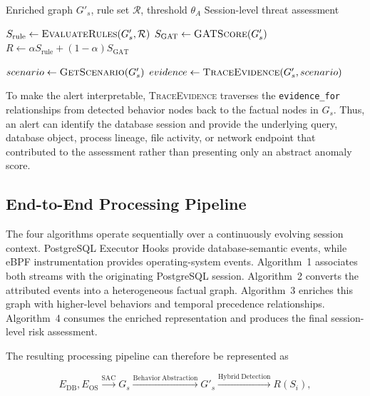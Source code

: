 \documentclass[conference]{IEEEtran}
\begin{document}
\begin{algorithm}[t]
\caption{Hybrid Cross-Layer Threat Detection}
\label{alg:hybrid}
\small
\begin{algorithmic}[1]
\Require Enriched graph $G'_s$, rule set $\mathcal{R}$, threshold $\theta_A$
\Ensure Session-level threat assessment

    \State $S_{\mathrm{rule}}\gets
    \Call{EvaluateRules}{G'_s,\mathcal{R}}$
    \State $S_{\mathrm{GAT}}\gets
    \Call{GATScore}{G'_s}$
    \State $R\gets
    \alpha S_{\mathrm{rule}}
    +(1-\alpha)S_{\mathrm{GAT}}$

        \State $scenario\gets\Call{GetScenario}{G'_s}$
        \State $evidence\gets\Call{TraceEvidence}{G'_s,scenario}$
        \State {}
    \Else
        \State {}
    \EndIf
\EndProcedure
\end{algorithmic}
\end{algorithm}

To make the alert interpretable, \textsc{TraceEvidence} traverses the \texttt{evidence\_for} relationships from detected behavior nodes back to the factual nodes in $G_s$. Thus, an alert can identify the database session and provide the underlying query, database object, process lineage, file activity, or network endpoint that contributed to the assessment rather than presenting only an abstract anomaly score.

\subsection{End-to-End Processing Pipeline}
\label{subsec:pipeline}

The four algorithms operate sequentially over a continuously evolving session context. PostgreSQL Executor Hooks provide database-semantic events, while eBPF instrumentation provides operating-system events. Algorithm~1 associates both streams with the originating PostgreSQL session. Algorithm~2 converts the attributed events into a heterogeneous factual graph. Algorithm~3 enriches this graph with higher-level behaviors and temporal precedence relationships. Algorithm~4 consumes the enriched representation and produces the final session-level risk assessment.

The resulting processing pipeline can therefore be represented as

\begin{equation}
E_{\mathrm{DB}},E_{\mathrm{OS}}
\xrightarrow{\mathrm{SAC}}
G_s
\xrightarrow{\mathrm{Behavior\ Abstraction}}
G'_s
\xrightarrow{\mathrm{Hybrid\ Detection}}
R(S_i),
\end{equation}
\end{document}
